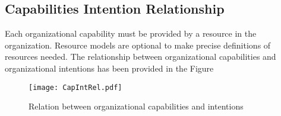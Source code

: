 \subsection{Capabilities Intention Relationship}
\label{sec:capIntRel}

 Each organizational capability must be provided by a resource in the organization. Resource models are optional to make precise definitions of resources needed. The relationship between organizational capabilities and organizational intentions has been provided in the Figure 
 
 \begin{figure}
 	\centering
 	\texttt{[image: CapIntRel.pdf]}
 	\caption{Relation between organizational capabilities and intentions}
 	\label{fig:orgcapabilities}
 \end{figure}


